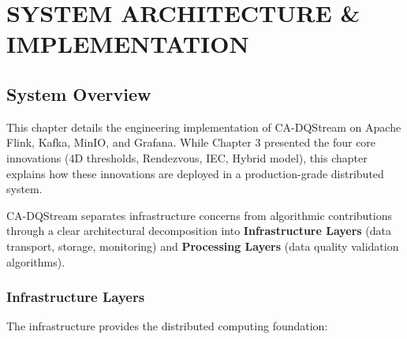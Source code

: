 \newpage
\chapter{SYSTEM ARCHITECTURE \& IMPLEMENTATION}
\pagestyle{fancy}

\section{System Overview}

This chapter details the engineering implementation of CA-DQStream on Apache Flink, Kafka, MinIO, and Grafana. While Chapter 3 presented the four core innovations (4D thresholds, Rendezvous, IEC, Hybrid model), this chapter explains how these innovations are deployed in a production-grade distributed system.

CA-DQStream separates infrastructure concerns from algorithmic contributions through a clear architectural decomposition into \textbf{Infrastructure Layers} (data transport, storage, monitoring) and \textbf{Processing Layers} (data quality validation algorithms).

\subsection{Infrastructure Layers}

The infrastructure provides the distributed computing foundation:

